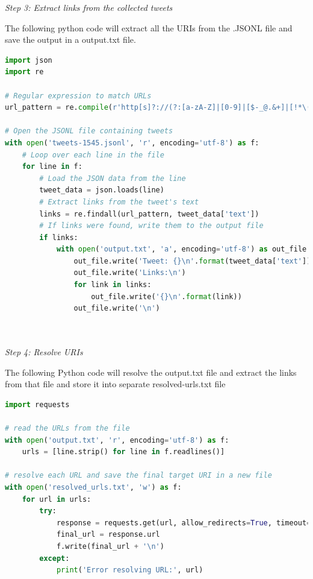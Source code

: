 \documentclass[12pt]{article}
\begin{document}
\emph{Step 3: Extract links from the collected tweets}

The following python code will extract all the URIs from the .JSONL file and save the output in a output.txt file.

\begin{lstlisting}[language=Python, caption=Extract the URIs from the .JSONL file, label=lst:copy]
import json
import re

# Regular expression to match URLs
url_pattern = re.compile(r'http[s]?://(?:[a-zA-Z]|[0-9]|[$-_@.&+]|[!*\(\),]|(?:%[0-9a-fA-F][0-9a-fA-F]))+')

# Open the JSONL file containing tweets
with open('tweets-1545.jsonl', 'r', encoding='utf-8') as f:
    # Loop over each line in the file
    for line in f:
        # Load the JSON data from the line
        tweet_data = json.loads(line)
        # Extract links from the tweet's text
        links = re.findall(url_pattern, tweet_data['text'])
        # If links were found, write them to the output file
        if links:
            with open('output.txt', 'a', encoding='utf-8') as out_file:
                out_file.write('Tweet: {}\n'.format(tweet_data['text']))
                out_file.write('Links:\n')
                for link in links:
                    out_file.write('{}\n'.format(link))
                out_file.write('\n')

  
\end{lstlisting}

\emph{Step 4: Resolve URIs}

The following Python code will resolve the output.txt file and extract the links from that file and store it into separate resolved-urls.txt file

\begin{lstlisting}[language=Python, caption=Resolve the URIs to extract URLs from output.txt, label=lst:copy]
import requests

# read the URLs from the file
with open('output.txt', 'r', encoding='utf-8') as f:
    urls = [line.strip() for line in f.readlines()]

# resolve each URL and save the final target URI in a new file
with open('resolved_urls.txt', 'w') as f:
    for url in urls:
        try:
            response = requests.get(url, allow_redirects=True, timeout=5)
            final_url = response.url
            f.write(final_url + '\n')
        except:
            print('Error resolving URL:', url)
  
\end{lstlisting}
\end{document}
